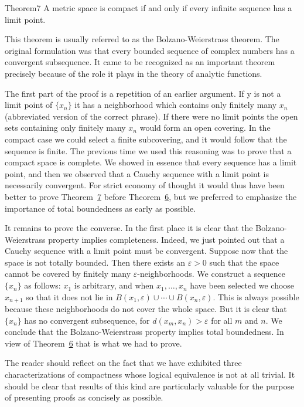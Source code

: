\begin{originalstatement}{Theorem}{7}\label{thm:3.7}
A metric space is compact if and only if every infinite sequence has a limit point.
\end{originalstatement}
This theorem is usually referred to as the Bolzano-Weierstrass theorem. The original formulation was that every bounded sequence of complex numbers has a convergent subsequence. It came to be recognized as an important theorem precisely because of the role it plays in the theory of analytic functions.

The first part of the proof is a repetition of an earlier argument. If y is not a limit point of $\{x_{n}\}$ it has a neighborhood which contains only finitely many $x_{n}$ (abbreviated version of the correct phrase). If there were no limit points the open sets containing only finitely many $x_{n}$ would form an open covering. In the compact case we could select a finite subcovering, and it would follow that the sequence is finite. The previous time we used this reasoning was to prove that a compact space is complete. We showed in essence that every sequence has a limit point, and then we observed that a Cauchy sequence with a limit point is necessarily convergent. For strict economy of thought it would thus have been better to prove Theorem~\hyperref[thm:3.7]{7} before Theorem~\hyperref[thm:3.6]{6}, but we preferred to emphasize the importance of total boundedness as early as possible.

It remains to prove the converse. In the first place it is clear that the Bolzano-Weierstrass property implies completeness. Indeed, we just pointed out that a Cauchy sequence with a limit point must be convergent. Suppose now that the space is not totally bounded. Then there exists an $\varepsilon > 0$ such that the space cannot be covered by finitely many $\varepsilon$-neighborhoods. We construct a sequence $\{x_n\}$ as follows: $x_1$ is arbitrary, and when $x_1, \ldots, x_n$ have been selected we choose $x_{n+1}$ so that it does not lie in $B(x_1, \varepsilon) \cup \cdots \cup B(x_n, \varepsilon)$. This is always possible because these neighborhoods do not cover the whole space. But it is clear that $\{x_n\}$ has no convergent subsequence, for $d(x_m, x_n) > \varepsilon$ for all $m$ and $n$. We conclude that the Bolzano-Weierstrass property implies total boundedness. In view of Theorem~\hyperref[thm:3.6]{6} that is what we had to prove.


The reader should reflect on the fact that we have exhibited three characterizations of compactness whose logical equivalence is not at all trivial. It should be clear that results of this kind are particularly valuable for the purpose of presenting proofs as concisely as possible.

